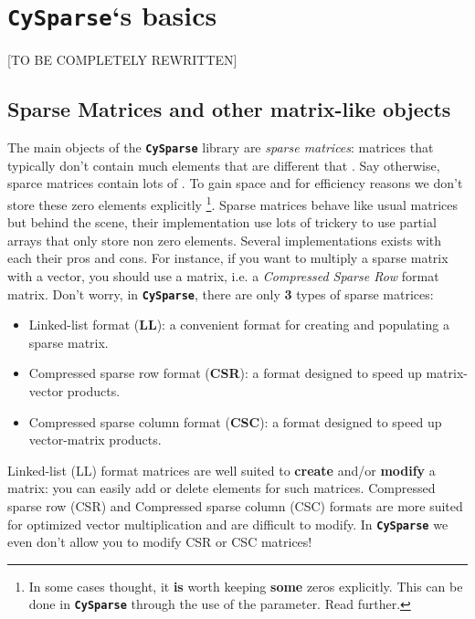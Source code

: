 \documentclass[letterpaper,10pt,english]{sphinxmanual}
\begin{document}
\chapter{\textbf{\texttt{CySparse}}`s basics}
\label{cysparse_basics:cysparse-s-basics}\label{cysparse_basics:cysparse-basics}\label{cysparse_basics::doc}
{[}TO BE COMPLETELY REWRITTEN{]}


\section{Sparse Matrices and other matrix-like objects}
\label{cysparse_basics:sparse-matrices-and-other-matrix-like-objects}
The main objects of the \textbf{\texttt{CySparse}} library are \emph{sparse matrices}: matrices that typically don't contain much elements that are different that . Say otherwise, sparce matrices contain lots of .
To gain space and for efficiency reasons we don't store these zero elements explicitly \footnote{
In some cases thought, it \textbf{is} worth keeping \textbf{some} zeros explicitly. This can be done in \textbf{\texttt{CySparse}} through the use of the  parameter. Read further.
}. Sparse matrices behave like usual matrices but behind the scene, their implementation use lots of trickery to use
partial arrays that only store non zero elements. Several implementations exists with each their pros and cons. For instance, if you want to multiply a sparse matrix with a vector, you should use a  matrix,
i.e. a  \emph{Compressed Sparse Row} format matrix. Don't worry, in \textbf{\texttt{CySparse}}, there are only \textbf{3} types of sparse matrices:
\begin{itemize}
\item {} 
Linked-list format (\textbf{LL}): a convenient format for creating and populating a sparse matrix.

\item {} 
Compressed sparse row format (\textbf{CSR}): a format designed to speed up matrix-vector products.

\item {} 
Compressed sparse column format (\textbf{CSC}): a format designed to speed up vector-matrix products.

\end{itemize}

Linked-list (LL) format matrices are well suited to \textbf{create} and/or \textbf{modify} a matrix: you can easily add or delete elements for such matrices. Compressed sparse row (CSR) and Compressed sparse column (CSC) formats
are more suited for optimized vector multiplication and are difficult to modify. In \textbf{\texttt{CySparse}} we even don't allow you to modify CSR or CSC matrices!
\end{document}

